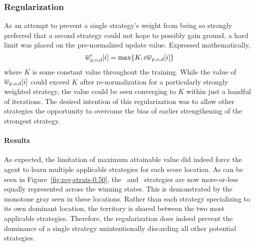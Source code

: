 

\subsubsection*{Regularization}


As an attempt to prevent a single strategy's weight from being so strongly 
preferred that a second strategy could not hope to possibly gain ground,
a hard limit was placed on the pre-normalized update value.
%
Expressed mathematically,
\[
    \overline{w}'_{p,o,d}[i] = \max\{K,c\overline{w}_{p,o,d}[i]\}
\]
where $K$ is some constant value throughout the training.
%
While the value of $\overline{w}_{p,o,d}[i]$ could exceed $K$ after re-normalization
for a particularly strongly weighted strategy,
the value could be seen converging to $K$ within just a handful of iterations.
%
The desired intention of this regularization was to allow other strategies
the opportunity to overcome the bias of earlier strengthening of the strongest
strategy.

\paragraph*{Results}



%
%



As expected,
the limitation of maximum attainable value did indeed force the agent to learn
multiple applicable strategies for each score location.
%
As can be seen in Figure~\ref{fig:reg-strats-0.50},
the \handmaxmin\ and \handmaxavg\ strategies are now 
more-or-less equally represented across the winning states.
%
This is demonstrated by the monotone gray seen in these locations.
%
Rather than each strategy specializing to its own dominant location,
the territory is shared between the two most applicable strategies.
%
Therefore,
the regularization does indeed prevent the dominance of a single strategy
unintentionally discarding all other potential strategies.

